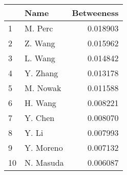 \begin{tabular}{llr}
\toprule
{} &       Name &  Betweeness \\
\midrule
1  &    M. Perc &    0.018903 \\
2  &    Z. Wang &    0.015962 \\
3  &    L. Wang &    0.014842 \\
4  &   Y. Zhang &    0.013178 \\
5  &   M. Nowak &    0.011588 \\
6  &    H. Wang &    0.008221 \\
7  &    Y. Chen &    0.008070 \\
8  &      Y. Li &    0.007993 \\
9  &  Y. Moreno &    0.007132 \\
10 &  N. Masuda &    0.006087 \\
\bottomrule
\end{tabular}
